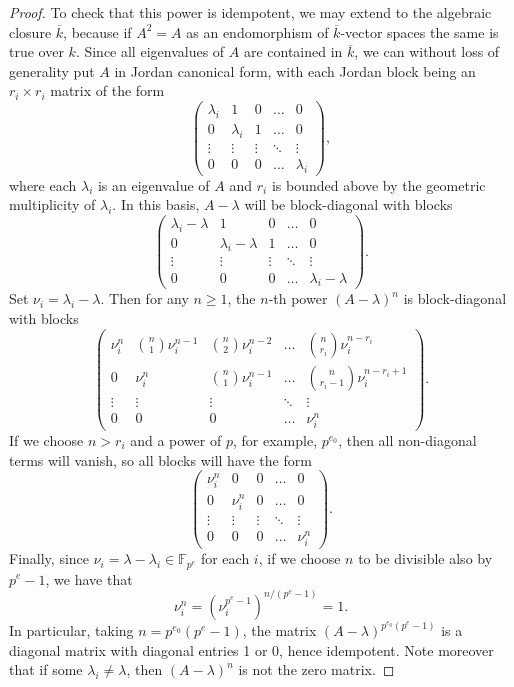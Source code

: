 \documentclass[12pt]{article}
\let\bar\overline
\def\FF{\mathbb F}
\theoremstyle{theorem}
\numberwithin{thm}{section}
\theoremstyle{definition}
\begin{document}
\begin{proof}
To check that this power is idempotent, we may extend to the algebraic closure $\bar k$, because if $A^2=A$ as an endomorphism of $\bar k$-vector spaces the same is true over $k$.
  Since all eigenvalues of $A$ are contained in $\bar k$, we can without loss of generality put $A$ in Jordan canonical form, with each Jordan block being an $r_i\times r_i$ matrix of the form
  \[ \begin{pmatrix}
        \lambda_i & 1 & 0 & \dots & 0 \\
        0 & \lambda_i & 1  & \dots & 0 \\
        \vdots & \vdots & \vdots & \ddots & \vdots \\
        0 & 0 & 0 & \dots & \lambda_i
    \end{pmatrix}, \]
  where each $\lambda_i$ is an eigenvalue of $A$ and $r_i$ is bounded above by the geometric multiplicity of $\lambda_i$.
  In this basis, $A-\lambda$ will be block-diagonal with blocks
  \[ \begin{pmatrix}
    \lambda_i-\lambda & 1 & 0 & \dots & 0 \\
    0 & \lambda_i-\lambda & 1 & \dots & 0 \\
    \vdots & \vdots & \vdots & \ddots & \vdots \\
    0 & 0 & 0 & \dots & \lambda_i-\lambda
  \end{pmatrix}. \]
  Set $\nu_i=\lambda_i-\lambda$. Then for any $n\geq 1$,
  the $n$-th power $(A-\lambda)^n$ is block-diagonal with blocks
  \[ \begin{pmatrix}
    \nu_i^n & \binom{n}1\nu_i^{n-1} & \binom{n}2\nu_i^{n-2} & \dots & \binom{n}{r_i}\nu_i^{n-r_i} \\
    0 & \nu_i^n & \binom{n}1\nu_i^{n-1} & \dots & \binom{n}{r_i-1}\nu_i^{n-r_i+1} \\
    \vdots & \vdots & \vdots & \ddots & \vdots \\
    0 & 0 & 0 & \dots & \nu_i^n
  \end{pmatrix}. \]
  If we choose $n > r_i$ and a power of $p$, for example, $p^{e_0}$, then all non-diagonal terms will vanish, so all blocks will have the form
  \[ \begin{pmatrix}
    \nu_i^n & 0 & 0 & \dots & 0 \\
    0 & \nu_i^n & 0 & \dots & 0 \\
    \vdots & \vdots & \vdots & \ddots & \vdots \\
    0 & 0 & 0 & \dots & \nu_i^n
  \end{pmatrix}. \]
  Finally, since $\nu_i =\lambda-\lambda_i \in \FF_{p^e}$ for each $i$, if we choose $n$ to be divisible also by $p^e-1$, we have that $$\nu_i^{n} = (\nu_i^{p^{e}-1})^{n/(p^{e}-1)} =1.$$
  In particular, taking $n=p^{e_0}(p^e-1)$, the matrix $(A-\lambda)^{p^{e_0}(p^e-1)}$ is a diagonal matrix with diagonal entries 1 or 0, hence idempotent. Note moreover that if some $\lambda_i\neq \lambda$, then $(A-\lambda)^n$ is not the zero matrix.
\end{proof}
\end{document}
